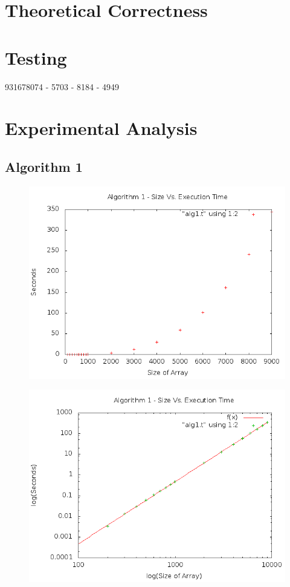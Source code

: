 \documentclass[a4paper,10pt]{article}
\begin{document}
	\section{Theoretical Correctness}

	\section{Testing}
	931678074 - 5703
	 - 8184
	 - 4949 
\newpage
	\section{Experimental Analysis}
		\subsection{Algorithm 1}
		
\begin{figure}[!htb]
\centering
\includegraphics[scale=.5]{timingfiles/alg1plot.png}
\end{figure}
\begin{figure}[!htb]
\centering
\includegraphics[scale=.5]{timingfiles/alg1plotlog.png}
\end{figure}
		\newpage
\end{document}
